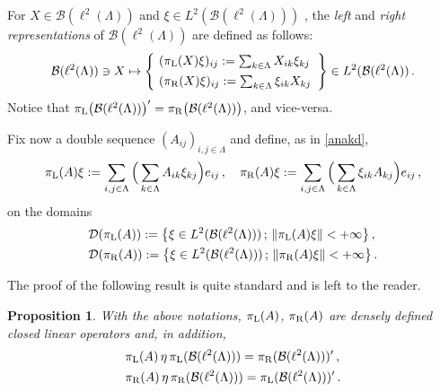 \documentclass[12pt]{amsart}
\numberwithin{equation}{section}
\def\cb{{\mathcal B}}
\def\cd{{\mathcal D}}
\newtheorem{prop}[thm]{Proposition}
\begin{document}
For $X\in\cb(\ell^2(\Lambda))$ and $\xi\in L^2(\cb(\ell^2(\Lambda)))$ , the {\it left} and {\it right representations} of $\cb(\ell^2(\Lambda))$  are defined as follows:
\begin{equation}
\label{anakd}
\cb(\ell^2(\Lambda))\ni X \mapsto\left\{\begin{array}{ll}
                     \!\!\!\!\!\!\!&(\pi_{\rm L}(X)\xi)_{ij}:=\sum_{k\in \Lambda} X_{ik}\xi_{kj} \\[1ex]
\!\!\!\!\!\!\!&(\pi_{\rm R}(X)\xi)_{ij}:=\sum_{k\in \Lambda} \xi_{ik}X_{kj}
                    \end{array}
                    \right\}\in L^2(\cb(\ell^2(\Lambda))\,.
\end{equation} 
Notice that $\pi_{\rm L}\big(\cb(\ell^2(\Lambda))\big)'=\pi_{\rm R}\big(\cb(\ell^2(\Lambda))\big)$, and vice-versa.

Fix now a double sequence $(A_{ij})_{i,j\in \Lambda}$ and define, as in \eqref{anakd},
$$
\pi_{\rm L}(A)\xi:=\sum_{i,j\in \Lambda}\Big(\sum_{k\in \Lambda}A_{ik}\xi_{kj}\Big)e_{ij}\,,\quad
\pi_{\rm R}(A)\xi:=\sum_{i,j\in \Lambda}\Big(\sum_{k\in \Lambda}\xi_{ik}A_{kj}\Big)e_{ij}\,,
$$
on the domains
\begin{align*}
&\cd({\pi_{\rm L}}(A)):=\big\{\xi\in L^2(\cb(\ell^2(\Lambda)))\,;\,\|\pi_{\rm L}(A)\xi\|<+\infty\big\}\,,\\
&\cd({\pi_{\rm R}}(A)):=\big\{\xi\in L^2(\cb(\ell^2(\Lambda)))\,;\,\|\pi_{\rm R}(A)\xi\|<+\infty\big\}\,.
\end{align*}

The proof of the following result is quite standard and is left to the reader.
\begin{prop}
\label{poseaf}
With the above notations, $\pi_{\rm L}(A)$, $\pi_{\rm R}(A)$ are densely defined closed linear operators and, in addition,
\begin{align*}
&\pi_{\rm L}(A)\,\eta\,\pi_{\rm L}(\cb(\ell^2(\Lambda)))=\pi_{\rm R}(\cb(\ell^2(\Lambda)))'\,,\\
&\pi_{\rm R}(A)\,\eta\,\pi_{\rm R}(\cb(\ell^2(\Lambda)))=\pi_{\rm L}(\cb(\ell^2(\Lambda)))'\,.
\end{align*}
\end{prop}

\medskip
\end{document}
